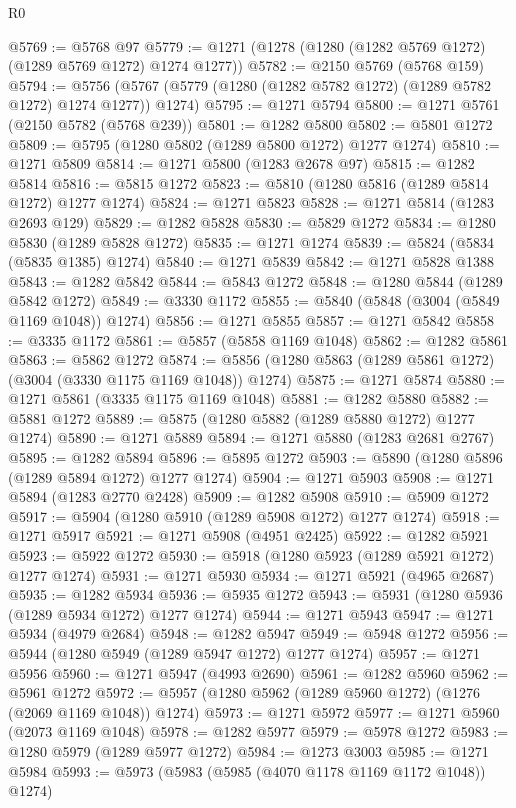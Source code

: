 \begin{lexlean}{R0}
\begin{coremodule}
@5769 := @5768 @97
@5779 := @1271 (@1278 (@1280 (@1282 @5769 @1272) (@1289 @5769 @1272) @1274 @1277))
@5782 := @2150 @5769 (@5768 @159)
@5794 := @5756 (@5767 (@5779 (@1280 (@1282 @5782 @1272) (@1289 @5782 @1272) @1274 @1277)) @1274)
@5795 := @1271 @5794
@5800 := @1271 @5761 (@2150 @5782 (@5768 @239))
@5801 := @1282 @5800
@5802 := @5801 @1272
@5809 := @5795 (@1280 @5802 (@1289 @5800 @1272) @1277 @1274)
@5810 := @1271 @5809
@5814 := @1271 @5800 (@1283 @2678 @97)
@5815 := @1282 @5814
@5816 := @5815 @1272
@5823 := @5810 (@1280 @5816 (@1289 @5814 @1272) @1277 @1274)
@5824 := @1271 @5823
@5828 := @1271 @5814 (@1283 @2693 @129)
@5829 := @1282 @5828
@5830 := @5829 @1272
@5834 := @1280 @5830 (@1289 @5828 @1272)
@5835 := @1271 @1274
@5839 := @5824 (@5834 (@5835 @1385) @1274)
@5840 := @1271 @5839
@5842 := @1271 @5828 @1388
@5843 := @1282 @5842
@5844 := @5843 @1272
@5848 := @1280 @5844 (@1289 @5842 @1272)
@5849 := @3330 @1172
@5855 := @5840 (@5848 (@3004 (@5849 @1169 @1048)) @1274)
@5856 := @1271 @5855
@5857 := @1271 @5842
@5858 := @3335 @1172
@5861 := @5857 (@5858 @1169 @1048)
@5862 := @1282 @5861
@5863 := @5862 @1272
@5874 := @5856 (@1280 @5863 (@1289 @5861 @1272) (@3004 (@3330 @1175 @1169 @1048)) @1274)
@5875 := @1271 @5874
@5880 := @1271 @5861 (@3335 @1175 @1169 @1048)
@5881 := @1282 @5880
@5882 := @5881 @1272
@5889 := @5875 (@1280 @5882 (@1289 @5880 @1272) @1277 @1274)
@5890 := @1271 @5889
@5894 := @1271 @5880 (@1283 @2681 @2767)
@5895 := @1282 @5894
@5896 := @5895 @1272
@5903 := @5890 (@1280 @5896 (@1289 @5894 @1272) @1277 @1274)
@5904 := @1271 @5903
@5908 := @1271 @5894 (@1283 @2770 @2428)
@5909 := @1282 @5908
@5910 := @5909 @1272
@5917 := @5904 (@1280 @5910 (@1289 @5908 @1272) @1277 @1274)
@5918 := @1271 @5917
@5921 := @1271 @5908 (@4951 @2425)
@5922 := @1282 @5921
@5923 := @5922 @1272
@5930 := @5918 (@1280 @5923 (@1289 @5921 @1272) @1277 @1274)
@5931 := @1271 @5930
@5934 := @1271 @5921 (@4965 @2687)
@5935 := @1282 @5934
@5936 := @5935 @1272
@5943 := @5931 (@1280 @5936 (@1289 @5934 @1272) @1277 @1274)
@5944 := @1271 @5943
@5947 := @1271 @5934 (@4979 @2684)
@5948 := @1282 @5947
@5949 := @5948 @1272
@5956 := @5944 (@1280 @5949 (@1289 @5947 @1272) @1277 @1274)
@5957 := @1271 @5956
@5960 := @1271 @5947 (@4993 @2690)
@5961 := @1282 @5960
@5962 := @5961 @1272
@5972 := @5957 (@1280 @5962 (@1289 @5960 @1272) (@1276 (@2069 @1169 @1048)) @1274)
@5973 := @1271 @5972
@5977 := @1271 @5960 (@2073 @1169 @1048)
@5978 := @1282 @5977
@5979 := @5978 @1272
@5983 := @1280 @5979 (@1289 @5977 @1272)
@5984 := @1273 @3003
@5985 := @1271 @5984
@5993 := @5973 (@5983 (@5985 (@4070 @1178 @1169 @1172 @1048)) @1274)

\end{coremodule}
\end{lexlean}

